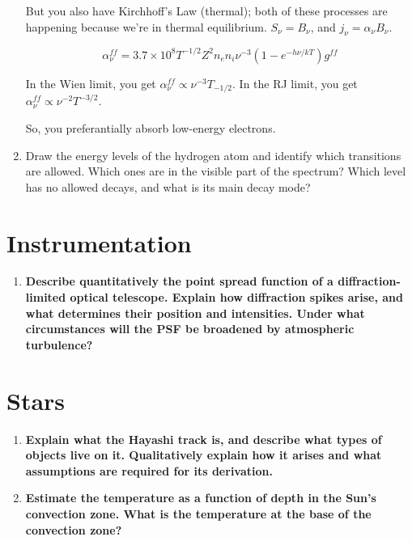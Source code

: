 \documentclass[12pt, letterpaper, preprint]{aastex}
\begin{document}
\begin{enumerate}
But you also have Kirchhoff's Law (thermal); both of these
processes are happening because we're in thermal equilibrium.
$S_\nu = B_\nu$, and $j_\nu = \alpha_\nu B_\nu$. 

\begin{equation}
  \alpha_\nu^{ff} = 3.7 \times 10^8 T^{-1/2} Z^2 n_e n_i \nu^{-3}
  (1-e^{-h\nu/kT}) g^{ff}
\end{equation}

In the Wien limit, you get $\alpha_\nu^{ff} \propto \nu^{-3} T_{-1/2}$.
In the RJ limit, you get $\alpha_\nu^{ff} \propto \nu^{-2} T^{-3/2}$.

So, you preferantially absorb low-energy electrons.


  \item Draw the energy levels of the hydrogen atom and 
    identify which transitions are allowed. 
    Which ones are in the visible part of the spectrum? 
    Which level has no allowed decays, and what is its main decay mode?
\end{enumerate}

\section*{Instrumentation}

\begin{enumerate}
  \item \textbf{Describe quantitatively the point spread function 
      of a diffraction-limited optical telescope. 
      Explain how diffraction spikes arise, 
      and what determines their position and intensities. 
      Under what circumstances will the PSF be broadened by atmospheric
      turbulence?}
\end{enumerate}

\section*{Stars}
\begin{enumerate}
  \item \textbf{Explain what the Hayashi track is, 
      and describe what types of objects live on it.
      Qualitatively explain how it arises and what 
      assumptions are required for its derivation.}
  \item \textbf{Estimate the temperature as a function 
      of depth in the Sun’s convection zone.
      What is the temperature at the base of the convection zone?}
\end{enumerate}
\end{document}
